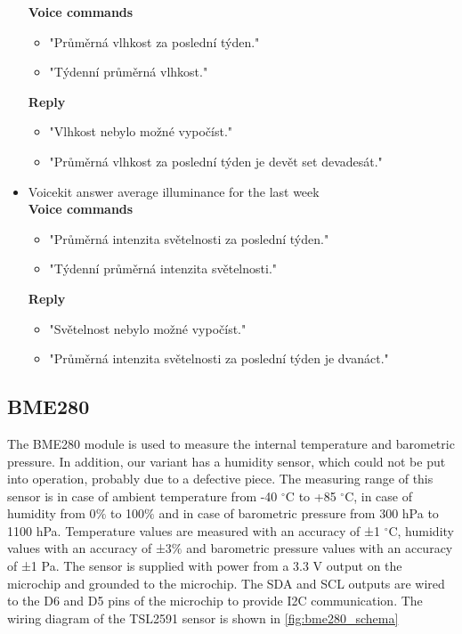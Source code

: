 \begin{itemize}
    \textbf{Voice commands}
    \begin{itemize}
        \item "Průměrná vlhkost za poslední týden."
        \item "Týdenní průměrná vlhkost."
    \end{itemize}
    \textbf{Reply}
    \begin{itemize}
        \item "Vlhkost nebylo možné vypočíst."
        \item "Průměrná vlhkost za poslední týden je devět set devadesát."
    \end{itemize}
    \item Voicekit answer average illuminance for the last week\\
    \textbf{Voice commands}
    \begin{itemize}
        \item "Průměrná intenzita světelnosti za poslední týden."
        \item "Týdenní průměrná intenzita světelnosti."
    \end{itemize}
    \textbf{Reply}
    \begin{itemize}
        \item "Světelnost nebylo možné vypočíst."
        \item "Průměrná intenzita světelnosti za poslední týden je dvanáct."
    \end{itemize}
\end{itemize}

\subsection{BME280}

The BME280 \citep{BME280:Datasheet} module is used to measure the internal temperature and barometric pressure. In addition, our variant has a humidity sensor, which could not be put into operation, probably due to a defective piece. The measuring range of this sensor is in case of ambient temperature from -40 $^{\circ}$C to +85 $^{\circ}$C, in case of humidity from 0$\%$ to 100$\%$ and in case of barometric pressure from 300 hPa to 1100 hPa. Temperature values are measured with an accuracy of ±1 $^{\circ}$C, humidity values with an accuracy of ±3$\%$ and barometric pressure values with an accuracy of ±1 Pa. The sensor is supplied with power from a 3.3 V output on the microchip and grounded to the microchip. The SDA and SCL outputs are wired to the D6 and D5 pins of the microchip to provide I2C communication. The wiring diagram of the TSL2591 sensor is shown in \cref{fig:bme280_schema}

